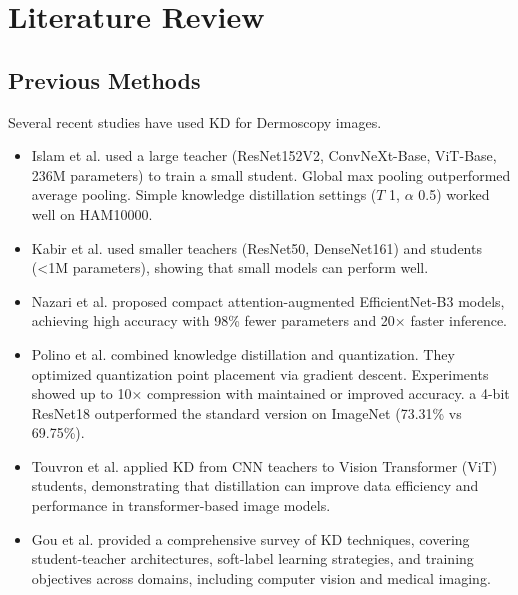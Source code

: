 \documentclass[conference]{IEEEtran}
\begin{document}
\section*{Literature Review}
\subsection*{Previous Methods}

Several recent studies have used KD for Dermoscopy images.\\

\begin{itemize}
\item Islam et al. used a large teacher (ResNet152V2, ConvNeXt-Base, ViT-Base, 236M parameters) to train a small student. Global max pooling outperformed average pooling. Simple knowledge distillation settings ($T$ 1, $\alpha$ 0.5) worked well on HAM10000.\cite{islam2024}\\

\item Kabir et al. used smaller teachers (ResNet50, DenseNet161) and students (<1M parameters), showing that small models can perform well. \cite{kabir2024}\\

\item Nazari et al. proposed compact attention-augmented EfficientNet-B3 models, achieving high accuracy with 98\% fewer parameters and 20$\times$ faster inference. \cite{nazari2025}\\

\item Polino et al. combined knowledge distillation and quantization. They optimized quantization point placement via gradient descent. Experiments showed up to 10× compression with maintained or improved accuracy. a 4-bit ResNet18 outperformed the standard version on ImageNet (73.31\% vs 69.75\%). \cite{Polino2018}\\

\item Touvron et al. applied KD from CNN teachers to Vision Transformer (ViT) students, demonstrating that distillation can improve data efficiency and performance in transformer-based image models. \cite{Touvron2021}\\

\item Gou et al. provided a comprehensive survey of KD techniques, covering student-teacher architectures, soft-label learning strategies, and training objectives across domains, including computer vision and medical imaging. \cite{Gou2021} \\



\end{itemize}
\end{document}
